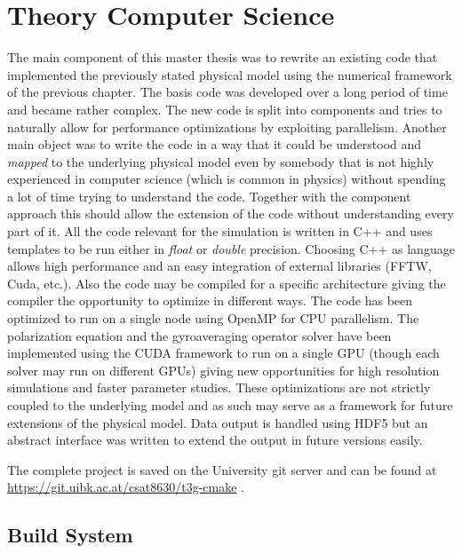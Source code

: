 \documentclass[12pt,oneside,bibtotoc,liststotoc]{scrbook}
\begin{document}
\chapter{Theory Computer Science}
The main component of this master thesis was to rewrite an existing code that implemented the previously stated physical model using the numerical framework of the previous chapter. The basis code was developed over a long period of time and became rather complex. The new code is split into components and tries to naturally allow for performance optimizations by exploiting parallelism. Another main object was to write the code in a way that it could be understood and \textit{mapped} to the underlying physical model even by somebody that is not highly experienced in computer science (which is common in physics) without spending a lot of time trying to understand the code. Together with the component approach this should allow the extension of the code without understanding every part of it.\newline
All the code relevant for the simulation is written in C++ and uses templates to be run either in \textit{float} or \textit{double} precision. Choosing C++ as language allows high performance and an easy integration of external libraries (FFTW, Cuda, etc.). Also the code may be compiled for a specific architecture giving the compiler the opportunity to optimize in different ways.\newline
The code has been optimized to run on a single node using OpenMP for CPU parallelism. The polarization equation and the gyroaveraging operator solver have been implemented using the CUDA framework to run on a single GPU (though each solver may run on different GPUs) giving new opportunities for high resolution simulations and faster parameter studies. These optimizations are not strictly coupled to the underlying model and as such may serve as a framework for future extensions of the physical model.\newline
Data output is handled using HDF5 but an abstract interface was written to extend the output in future versions easily.

The complete project is saved on the University git server and can be found at \href{https://git.uibk.ac.at/csat8630/t3g-cmake}{https://git.uibk.ac.at/csat8630/t3g-cmake}
.

\section{Build System}

\end{document}
